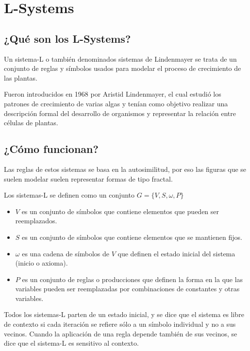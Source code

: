 \chapter{L-Systems}

\section{¿Qué son los L-Systems?}

\noindent Un sistema-L o también denominados sistemas de Lindenmayer se trata de un conjunto de reglas y símbolos usados para modelar el proceso de crecimiento de las plantas.

\noindent Fueron introducidos en 1968 por Aristid Lindenmayer, el cual estudió los patrones de crecimiento de varias algas y tenían como objetivo realizar una descripción formal del desarrollo de organismos y representar la relación entre células de plantas.

\section{¿Cómo funcionan?}

\noindent Las reglas de estos sistemas se basa en la autosimilitud, por eso las figuras que se suelen modelar suelen representar formas de tipo fractal.

\noindent Los sistemas-L se definen como un conjunto $G=\{V,S, \omega ,P\}$

\begin{itemize}
    \item $V$ es un conjunto de símbolos que contiene elementos que pueden ser reemplazados.
    \item $S$ es un conjunto de símbolos que contiene elementos que se mantienen fijos.
    \item $\omega$ es una cadena de símbolos de $V$ que definen el estado inicial del sistema (inicio o axioma).
    \item $P$ es un conjunto de reglas o producciones que definen la forma en la que las variables pueden ser reemplazadas por combinaciones de constantes y otras variables.
\end{itemize}

\noindent Todos los sistemas-L parten de un estado inicial, y se dice que el sistema es libre de contexto si cada iteración se refiere sólo a un símbolo individual y no a sus vecinos. Cuando la aplicación de una regla depende también de sus vecinos, se dice que el sistema-L es sensitivo al contexto.

